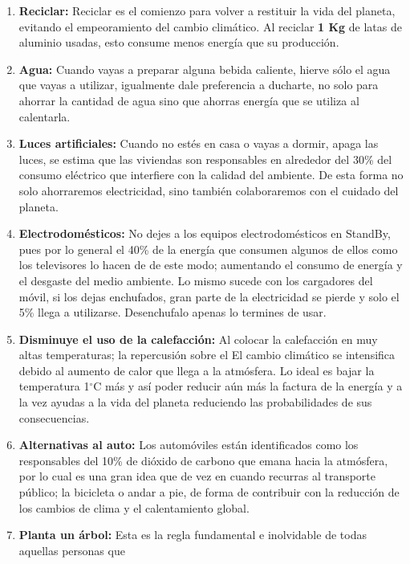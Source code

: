 \begin{enumerate}
	\item \textbf{Reciclar:} Reciclar es el comienzo para volver a restituir la vida del planeta, evitando el
	      empeoramiento del cambio climático. Al reciclar \textbf{1 Kg} de latas de aluminio usadas,
	      esto consume menos energía que su producción.
	\item \textbf{Agua:} Cuando vayas a preparar alguna bebida caliente, hierve sólo el agua que
	      vayas a utilizar, igualmente dale preferencia a ducharte, no solo para ahorrar la
	      cantidad de agua sino que ahorras energía que se utiliza al calentarla.
	\item \textbf{Luces artificiales:} Cuando no estés en casa o vayas a dormir, apaga las luces, se estima que las
	      viviendas son responsables en alrededor del 30\% del consumo eléctrico que interfiere
	      con la calidad del ambiente. De esta forma no solo ahorraremos electricidad, sino
	      también colaboraremos con el cuidado del planeta.
	\item \textbf{Electrodomésticos:} No dejes a los equipos electrodomésticos en StandBy, pues por lo general
	      el 40\% de la energía que consumen algunos de ellos como los televisores lo hacen de
	      de este modo; aumentando el consumo de energía y el desgaste del medio ambiente.
	      Lo mismo sucede con los cargadores del móvil, si los dejas enchufados, gran parte de
	      la electricidad se pierde y solo el 5\% llega a utilizarse. Desenchufalo apenas lo termines
	      de usar.
	\item \textbf{Disminuye el uso de la calefacción:} Al colocar la calefacción en muy altas temperaturas; la repercusión sobre el
	      El cambio climático se intensifica debido al aumento de calor que llega a la atmósfera. Lo
	      ideal es bajar la temperatura 1$^{\circ}$C más y así poder reducir aún más la factura de la
	      energía y a la vez ayudas a la vida del planeta reduciendo las probabilidades de sus
	      consecuencias.
	\item \textbf{Alternativas al auto:} Los automóviles están identificados como los responsables del 10\% de dióxido
	      de carbono que emana hacia la atmósfera, por lo cual es una gran idea que de vez en cuando recurras al transporte público; la bicicleta o andar a pie, de forma de contribuir
	      con la reducción de los cambios de clima y el calentamiento global.
	\item \textbf{Planta un árbol:} Esta es la regla fundamental e inolvidable de todas aquellas personas que

\end{enumerate}

